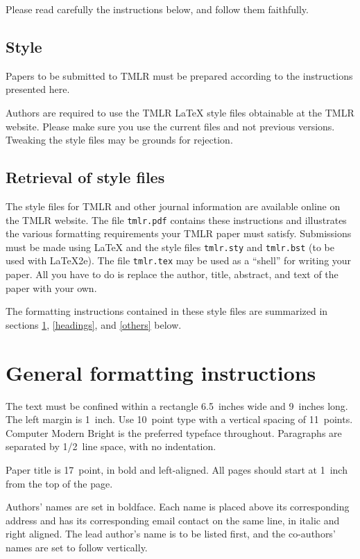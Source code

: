 \documentclass[10pt]{article} %
\begin{document}
Please read carefully the instructions below, and follow them
faithfully.

\subsection{Style}

Papers to be submitted to TMLR must be prepared according to the
instructions presented here.

Authors are required to use the TMLR \LaTeX{} style files obtainable at the
TMLR website. Please make sure you use the current files and
not previous versions. Tweaking the style files may be grounds for rejection.

\subsection{Retrieval of style files}

The style files for TMLR and other journal information are available online on
the TMLR website.
The file \verb+tmlr.pdf+ contains these
instructions and illustrates the
various formatting requirements your TMLR paper must satisfy.
Submissions must be made using \LaTeX{} and the style files
\verb+tmlr.sty+ and \verb+tmlr.bst+ (to be used with \LaTeX{}2e). The file
\verb+tmlr.tex+ may be used as a ``shell'' for writing your paper. All you
have to do is replace the author, title, abstract, and text of the paper with
your own.

The formatting instructions contained in these style files are summarized in
sections \ref{gen_inst}, \ref{headings}, and \ref{others} below.

\section{General formatting instructions}
\label{gen_inst}

The text must be confined within a rectangle 6.5~inches wide and
9~inches long. The left margin is 1~inch.
Use 10~point type with a vertical spacing of 11~points. Computer Modern Bright is the
preferred typeface throughout. Paragraphs are separated by 1/2~line space,
with no indentation.

Paper title is 17~point, in bold and left-aligned.
All pages should start at 1~inch from the top of the page.

Authors' names are
set in boldface. Each name is placed above its corresponding
address and has its corresponding email contact on the same line, in italic 
and right aligned. The lead author's name is to be listed first, and
the co-authors' names are set to follow vertically.
\end{document}
